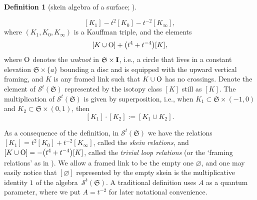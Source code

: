 \documentclass[10pt,a4paper]{amsart}
\numberwithin{equation}{section}
\theoremstyle{definition}
\newtheorem{Definition}[Theorem]{Definition}
\begin{document}
\begin{Definition}[skein algebra of a surface; \cite{Pr, Turaev}]
\begin{enumerate}[label={\rm (SA\arabic*)}]
\[
[K_1] - t^2 [K_0] - t^{-2} [K_\infty],
\]
where $(K_1,K_0,K_\infty)$ is a Kauffman triple, and the elements
\[
[K \cup {\rm O}] + \bigl(t^4+t^{-4}\bigr) [K],
\]
where ${\rm O}$ denotes the {\em unknot} in $\mathfrak{S} \times {\bf I}$, i.e., a circle that lives in a constant elevation $\mathfrak{S} \times \{ a\}$ bounding a disc and is equipped with the upward vertical framing, and $K$ is any framed link such that $K \cup {\rm O}$ has no crossings.
Denote the element of $\mathcal{S}^t(\mathfrak{S})$ represented by the isotopy class $[K]$ still as $[K]$.
The multiplication of $\mathcal{S}^t(\mathfrak{S})$ is given by superposition, i.e., when $K_1 \subset \mathfrak{S} \times (-1,0)$ and $K_2 \subset \mathfrak{S} \times (0,1)$, then
\[
[K_1] \cdot [K_2] := [K_1 \cup K_2].
\]
\end{enumerate}
\end{Definition}
As a consequence of the definition, in $\mathcal{S}^t(\mathfrak{S})$ we have the relations $[K_1] = t^2 [K_0] + t^{-2} [K_\infty]$, called the {\em skein relations}, and $[K\cup {\rm O}] = - \bigl(t^4+t^{-4}\bigr) [K]$, called the {\em trivial loop relations} (or the `framing relations' as in \cite{Bullock}). We allow a framed link to be the empty one $\varnothing$, and one may easily notice that $[{\varnothing}]$ represented by the empty skein is the multiplicative identity $1$ of the algebra~$\mathcal{S}^t(\mathfrak{S})$. A traditional definition uses $A$ as a quantum parameter, where we put $A = t^{-2}$ for later notational convenience.
\end{document}
